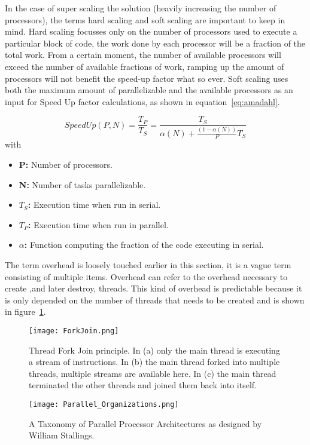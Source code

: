 In the case of super scaling the solution (heavily increasing the number of processors), the terms hard scaling and soft scaling are important to keep in mind.
Hard scaling focusses only on the number of processors used to execute a particular block of code, the work done by each processor will be a fraction of the total work.
From a certain moment, the number of available processors will exceed the number of available fractions of work, ramping up the amount of processors will not benefit the speed-up factor what so ever.
Soft scaling uses both the maximum amount of parallelizable and the available processors as an input for Speed Up factor calculations, as shown in equation~\ref{eq:amadahl}.
  
\begin{equation}
	SpeedUp(P,N) = \frac{T_P}{T_S} = \frac{T_S}{\alpha(N) + \frac{(1-\alpha(N))}{P} T_S}
	\label{eq:amadahl}
\end{equation}
with
\begin{itemize}
	\item \textbf{P:} Number of processors.
	\item \textbf{N:} Number of tasks parallelizable.
	\item \textbf{$T_S$:} Execution time when run in serial.
	\item \textbf{$T_P$:} Execution time when run in parallel.
	\item \textbf{$\alpha$:} Function computing the fraction of the code executing in serial.
\end{itemize}
The term overhead is loosely touched earlier in this section, it is a vague term consisting of multiple items.
Overhead can refer to the overhead necessary to create ,and later destroy, threads.
This kind of overhead is predictable because it is only depended on the number of threads that needs to be created and is shown in figure~\ref{fig:forkjoin}.
\begin{figure}
	\centering
	\texttt{[image: ForkJoin.png]}
	\caption{Thread Fork Join principle. In (a) only the main thread is executing a stream of instructions. In (b) the main thread forked into multiple threads, multiple streams are available here. In (c) the main thread terminated the other threads and joined them back into itself.}
	\label{fig:forkjoin}
\end{figure}
\begin{figure}
	\centering
	\texttt{[image: Parallel\_Organizations.png]}
	\caption{A Taxonomy of Parallel Processor Architectures as designed by William Stallings.}
	\label{fig:procOrg}
\end{figure}
